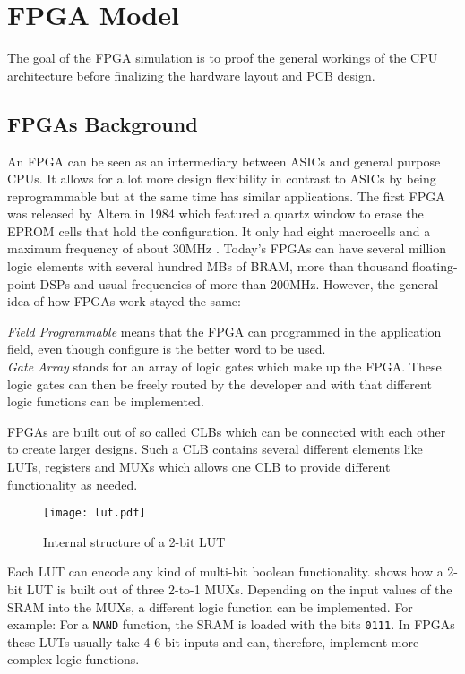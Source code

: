 \chapter{\gls{FPGA} Model}\label{cha:fpga}
The goal of the \gls{FPGA} simulation is to proof the general workings of the \gls{CPU} architecture before finalizing the hardware layout and \gls{PCB} design.


\section{\glspl{FPGA} Background}
An \gls{FPGA} can be seen as an intermediary between \glspl{ASIC} and general purpose \glspl{CPU}.
It allows for a lot more design flexibility in contrast to \glspl{ASIC} by being reprogrammable but at the same time has similar applications.
The first \gls{FPGA} was released by Altera in 1984 which featured a quartz window to erase the \gls{EPROM} cells that hold the configuration.
It only had eight macrocells and a maximum frequency of about 30MHz \cite{ref:altera_databook}.
Today's \glspl{FPGA} can have several million logic elements with several hundred MBs of \gls{BRAM}, more than thousand floating-point \glspl{DSP} and usual frequencies of more than 200MHz.
However, the general idea of how \glspl{FPGA} work stayed the same:

\emph{Field Programmable} means that the \gls{FPGA} can programmed in the application field, even though configure is the better word to be used.\\
\emph{Gate Array} stands for an array of logic gates which make up the \gls{FPGA}.
These logic gates can then be freely routed by the developer and with that different logic functions can be implemented.

\glspl{FPGA} are built out of so called \glspl{CLB} which can be connected with each other to create larger designs.
Such a \gls{CLB} contains several different elements like \glspl{LUT}, registers and \glspl{MUX} which allows one \gls{CLB} to provide different functionality as needed.
\begin{figure}
  \centering
  \texttt{[image: lut.pdf]}
  \caption{Internal structure of a 2-bit \gls{LUT}}
  \label{fig:lut}
\end{figure}
Each \gls{LUT} can encode any kind of multi-bit boolean functionality.
 shows how a 2-bit \gls{LUT} is built out of three 2-to-1 \glspl{MUX}.
Depending on the input values of the \gls{SRAM} into the \glspl{MUX}, a different logic function can be implemented.
For example: For a \texttt{NAND} function, the \gls{SRAM} is loaded with the bits \texttt{0111}.
In \glspl{FPGA} these \glspl{LUT} usually take 4-6 bit inputs and can, therefore, implement more complex logic functions.


